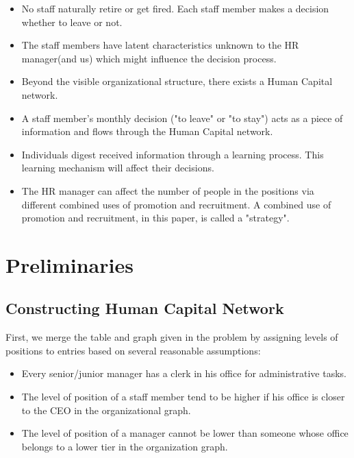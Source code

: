 \documentclass[tcn = 37075, sheet = false, abstract = false]{mcmthesis}
\begin{document}
	\begin{itemize}
		\item No staff naturally retire or get fired. Each staff member makes a decision whether to leave or not.
		\item The staff members have latent characteristics unknown to the HR manager(and us) which might influence the decision process.
		\item Beyond the visible organizational structure, there exists a Human Capital network.
		\item A staff member's monthly decision ("to leave" or "to stay") acts as a piece of information and flows through the Human Capital network.
		\item Individuals digest received information through a learning process. This learning mechanism will affect their decisions.
		\item The HR manager can affect the number of people in the positions via different combined uses of promotion and recruitment. A combined use of promotion and recruitment, in this paper, is called a "strategy".
	\end{itemize}
	
	\section{Preliminaries}
	
	\subsection{Constructing Human Capital Network}
	
	First, we merge the table and graph given in the problem by assigning levels of positions to entries  based on several reasonable assumptions:
	
	\begin{itemize}
		\item Every senior/junior manager has a clerk in his office for administrative tasks.
		\item The level of position of a staff member tend to be higher if his office is closer to the CEO in the organizational graph.
		\item The level of position of a manager cannot be lower than someone whose office belongs to a lower tier in the organization graph.
	\end{itemize}
	
\end{document}
